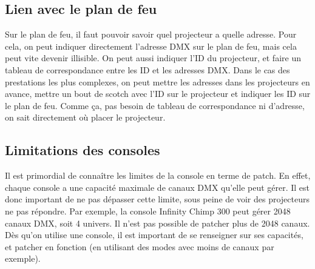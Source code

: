\subsection{Lien avec le plan de feu}
\label{subsec:patch_plan_de_feu}

Sur le plan de feu, il faut pouvoir savoir quel projecteur a quelle adresse.
Pour cela, on peut indiquer directement l'adresse DMX sur le plan de feu, mais cela peut vite devenir illisible.
On peut aussi indiquer l'ID du projecteur, et faire un tableau de correspondance entre les ID et les adresses DMX.
\newline
Dans le cas des prestations les plus complexes, on peut mettre les adresses dans les projecteurs en avance, mettre un bout de scotch avec l'ID sur le projecteur et indiquer les ID sur le plan de feu.
Comme ça, pas besoin de tableau de correspondance ni d'adresse, on sait directement où placer le projecteur.

\subsection{Limitations des consoles}
\label{subsec:patch_limitations}

Il est primordial de connaître les limites de la console en terme de patch.
En effet, chaque console a une capacité maximale de canaux DMX qu'elle peut gérer.
Il est donc important de ne pas dépasser cette limite, sous peine de voir des projecteurs ne pas répondre.
\newline
\newline
Par exemple, la console Infinity Chimp 300 peut gérer 2048 canaux DMX, soit 4 univers. Il n'est pas possible de patcher plus de 2048 canaux.
\newline
\newline
Dès qu'on utilise une console, il est important de se renseigner sur ses capacités, et patcher en fonction (en utilisant des modes avec moins de canaux par exemple).

